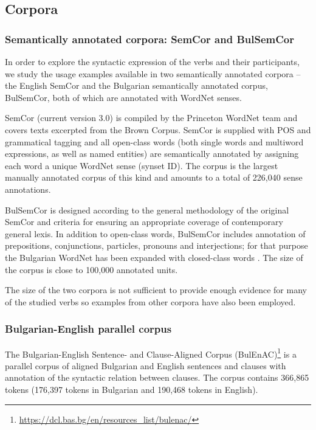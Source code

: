 \documentclass[output=paper,colorlinks,citecolor=brown]{langscibook}
\begin{document}
\subsection{Corpora}

\subsubsection{Semantically annotated corpora: SemCor and BulSemCor}

In order to explore the syntactic expression of the verbs and their participants, we study the usage examples available in two semantically annotated corpora -- the English SemCor and the Bulgarian semantically annotated corpus, BulSemCor, both of which are annotated with WordNet senses. 
 
SemCor (current version 3.0) \citep{miller-etal-1993-semantic,miller-etal-1994-using,landes1998} is compiled by the Princeton WordNet team and covers texts excerpted from the Brown Corpus. SemCor is supplied with POS and grammatical tagging and all open-class words (both single words and multiword expressions, as well as named entities) are semantically annotated by assigning each word a unique WordNet sense (synset ID). The corpus is the largest manually annotated corpus of this kind and amounts to a total of 226,040 sense annotations.

BulSemCor \citep{koeva-2006-bulsemcor,koeva-2011-bulsemcor} is designed according to the general methodology of the original SemCor and criteria for ensuring an appropriate coverage of contemporary general lexis. In addition to open-class words, BulSemCor includes annotation of prepositions, conjunctions, particles, pronouns and interjections; for that purpose the Bulgarian WordNet has been expanded with closed-class words \citep{koeva-2011-bulsemcor}. The size of the corpus is close to 100,000 annotated units. 

The size of the two corpora is not sufficient to provide enough evidence for many of the studied verbs so examples from other corpora have also been employed. 

\subsubsection{Bulgarian-English parallel corpus}

The Bulgarian-English Sentence- and Clause-Aligned Corpus (BulEnAC)\footnote{\url{https://dcl.bas.bg/en/resources\_list/bulenac/}} \citep{Koeva-et-al2012} is a parallel corpus of aligned Bulgarian and English sentences and clauses with annotation of the syntactic relation between clauses. The corpus contains 366,865 tokens (176,397 tokens in Bulgarian and 190,468 tokens in English). %
\end{document}
